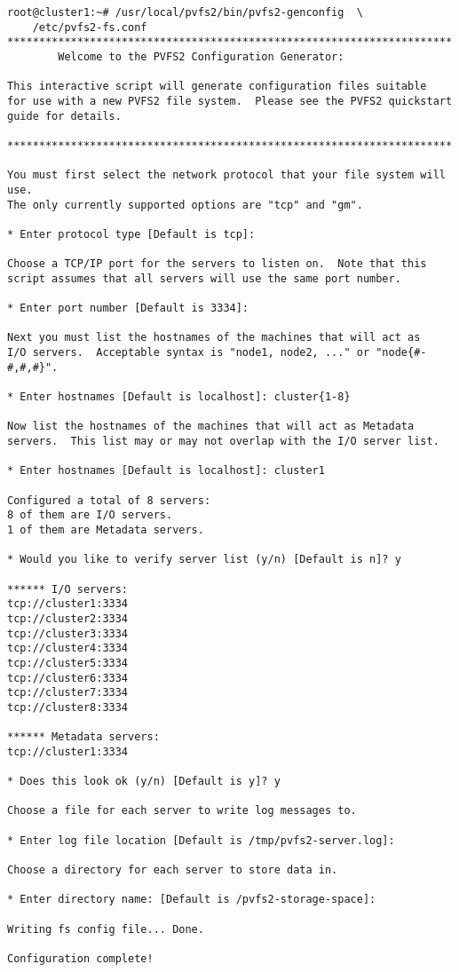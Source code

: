 \documentclass[11pt, letterpaper]{article}
\begin{document}
\begin{verbatim}
root@cluster1:~# /usr/local/pvfs2/bin/pvfs2-genconfig  \
	/etc/pvfs2-fs.conf
**********************************************************************
        Welcome to the PVFS2 Configuration Generator:

This interactive script will generate configuration files suitable
for use with a new PVFS2 file system.  Please see the PVFS2 quickstart
guide for details.

**********************************************************************

You must first select the network protocol that your file system will use.
The only currently supported options are "tcp" and "gm".

* Enter protocol type [Default is tcp]:

Choose a TCP/IP port for the servers to listen on.  Note that this
script assumes that all servers will use the same port number.

* Enter port number [Default is 3334]: 

Next you must list the hostnames of the machines that will act as
I/O servers.  Acceptable syntax is "node1, node2, ..." or "node{#-#,#,#}".

* Enter hostnames [Default is localhost]: cluster{1-8}

Now list the hostnames of the machines that will act as Metadata
servers.  This list may or may not overlap with the I/O server list.

* Enter hostnames [Default is localhost]: cluster1

Configured a total of 8 servers:
8 of them are I/O servers.
1 of them are Metadata servers.

* Would you like to verify server list (y/n) [Default is n]? y

****** I/O servers:
tcp://cluster1:3334
tcp://cluster2:3334
tcp://cluster3:3334
tcp://cluster4:3334
tcp://cluster5:3334
tcp://cluster6:3334
tcp://cluster7:3334
tcp://cluster8:3334

****** Metadata servers:
tcp://cluster1:3334

* Does this look ok (y/n) [Default is y]? y

Choose a file for each server to write log messages to.

* Enter log file location [Default is /tmp/pvfs2-server.log]: 

Choose a directory for each server to store data in.

* Enter directory name: [Default is /pvfs2-storage-space]: 

Writing fs config file... Done.

Configuration complete!
\end{verbatim}
\end{document}
